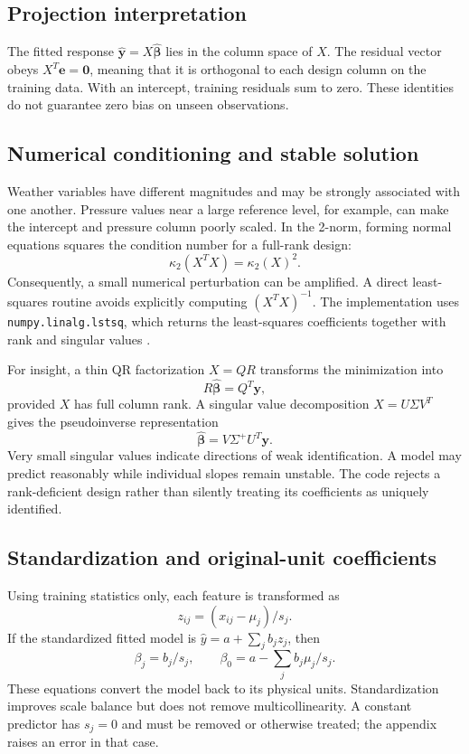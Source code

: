 \documentclass[11pt,a4paper]{article}
\begin{document}
\subsection{Projection interpretation}
The fitted response $\widehat{\mathbf y}=X\widehat{\boldsymbol\beta}$ lies in the column space of $X$. The residual vector obeys $X^T\mathbf e=\mathbf0$, meaning that it is orthogonal to each design column on the training data. With an intercept, training residuals sum to zero. These identities do not guarantee zero bias on unseen observations.

\clearpage
\subsection{Numerical conditioning and stable solution}
Weather variables have different magnitudes and may be strongly associated with one another. Pressure values near a large reference level, for example, can make the intercept and pressure column poorly scaled. In the 2-norm, forming normal equations squares the condition number for a full-rank design:
\begin{equation}
\kappa_2(X^TX)=\kappa_2(X)^2.
\end{equation}
Consequently, a small numerical perturbation can be amplified. A direct least-squares routine avoids explicitly computing $(X^TX)^{-1}$. The implementation uses \texttt{numpy.linalg.lstsq}, which returns the least-squares coefficients together with rank and singular values \cite{numpy}.

For insight, a thin QR factorization $X=QR$ transforms the minimization into
\begin{equation}
R\widehat{\boldsymbol\beta}=Q^T\mathbf y,
\end{equation}
provided $X$ has full column rank. A singular value decomposition $X=U\Sigma V^T$ gives the pseudoinverse representation
\begin{equation}
\widehat{\boldsymbol\beta}=V\Sigma^+U^T\mathbf y.
\end{equation}
Very small singular values indicate directions of weak identification. A model may predict reasonably while individual slopes remain unstable. The code rejects a rank-deficient design rather than silently treating its coefficients as uniquely identified.

\subsection{Standardization and original-unit coefficients}
Using training statistics only, each feature is transformed as
\begin{equation}
z_{ij}=(x_{ij}-\mu_j)/s_j.
\end{equation}
If the standardized fitted model is $\widehat y=a+\sum_jb_jz_j$, then
\begin{equation}
\beta_j=b_j/s_j,\qquad
\beta_0=a-\sum_j b_j\mu_j/s_j.
\end{equation}
These equations convert the model back to its physical units. Standardization improves scale balance but does not remove multicollinearity. A constant predictor has $s_j=0$ and must be removed or otherwise treated; the appendix raises an error in that case.
\end{document}
